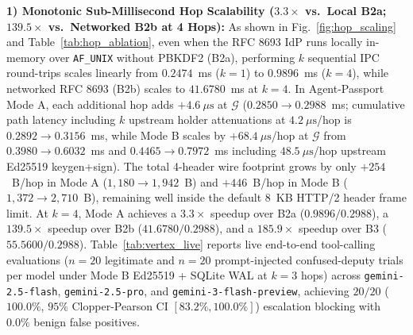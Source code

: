 \documentclass[conference,10pt]{IEEEtran}
\begin{document}
\begin{table}[t]
\centering
\caption{Live Google Cloud Vertex AI Multi-Model Evaluation (Mode B Ed25519 + SQLite WAL at $k=3$ Hops, \upshape\texttt{location="global"}, $n=20$ Trials/Model)}
\label{tab:vertex_live}
\end{table}

\textbf{1) Monotonic Sub-Millisecond Hop Scalability ($3.3\times$ vs.\ Local B2a; $139.5\times$ vs.\ Networked B2b at 4 Hops):} As shown in Fig.~\ref{fig:hop_scaling} and Table~\ref{tab:hop_ablation}, even when the RFC 8693 IdP runs locally in-memory over \texttt{AF\_UNIX} without PBKDF2 (B2a), performing $k$ sequential IPC round-trips scales linearly from $0.2474$~ms ($k=1$) to $0.9896$~ms ($k=4$), while networked RFC 8693 (B2b) scales to $41.6780$~ms at $k=4$. In Agent-Passport Mode A, each additional hop adds $+4.6~\mu\text{s}$ at $\mathcal{G}$ ($0.2850 \to 0.2988$~ms; cumulative path latency including $k$ upstream holder attenuations at $4.2~\mu\text{s}$/hop is $0.2892 \to 0.3156$~ms, while Mode B scales by $+68.4~\mu\text{s}$/hop at $\mathcal{G}$ from $0.3980 \to 0.6032$~ms and $0.4465 \to 0.7972$~ms including $48.5~\mu\text{s}$/hop upstream Ed25519 keygen+sign). The total 4-header wire footprint grows by only $+254$~B/hop in Mode A ($1{,}180 \to 1{,}942$~B) and $+446$~B/hop in Mode B ($1{,}372 \to 2{,}710$~B), remaining well inside the default $8$~KB HTTP/2 header frame limit. At $k=4$, Mode A achieves a $3.3\times$ speedup over B2a ($0.9896 / 0.2988$), a $139.5\times$ speedup over B2b ($41.6780 / 0.2988$), and a $185.9\times$ speedup over B3 ($55.5600 / 0.2988$). Table~\ref{tab:vertex_live} reports live end-to-end tool-calling evaluations ($n=20$ legitimate and $n=20$ prompt-injected confused-deputy trials per model under Mode B Ed25519 + SQLite WAL at $k=3$ hops) across \texttt{gemini-2.5-flash}, \texttt{gemini-2.5-pro}, and \texttt{gemini-3-flash-preview}, achieving $20/20$ ($100.0\%$, $95\%$ Clopper-Pearson CI $[83.2\%, 100.0\%]$) escalation blocking with $0.0\%$ benign false positives.
\end{document}
